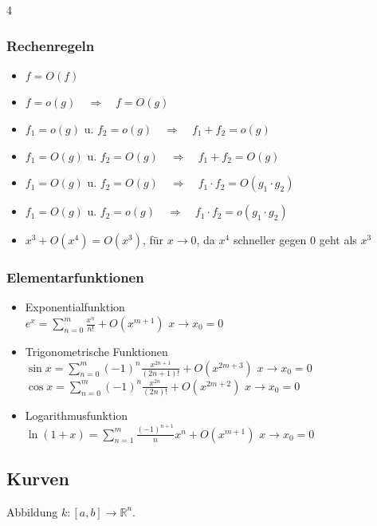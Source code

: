 \documentclass[6pt,a4paper]{scrartcl}
\begin{document}
\begin{multicols*}{4}
	\subsubsection{Rechenregeln}
	\begin{itemize}\itemsep-1pt
		\item $f = O(f)$
		\item $f = o(g) \quad\Rightarrow\quad f = O(g)$
		\item $f_1 = o(g)$ u. $f_2 = o(g) \quad\Rightarrow\quad f_1 + f_2 = o(g)$
		\item $f_1 = O(g)$ u. $f_2 = O(g) \quad\Rightarrow\quad f_1 + f_2 = O(g)$
		\item $f_1 = O(g)$ u. $f_2 = O(g) \quad\Rightarrow\quad f_1 \cdot f_2 = O(g_1 \cdot g_2)$
		\item $f_1 = O(g)$ u. $f_2 = o(g) \quad\Rightarrow\quad f_1 \cdot f_2 = o(g_1 \cdot g_2)$
		\item $x^3+O(x^4)=O(x^3)$, für $x \rightarrow 0$, da $x^4$ schneller gegen $0$ geht als $x^3$
	\end{itemize}
	\begin{sectionbox}
		\subsubsection{Elementarfunktionen}
		\begin{itemize}\itemsep-1pt
			\item Exponentialfunktion\\
			      $e^x = \sum\limits_{n = 0}^m\frac{x^n}{n!} + O(x^{m + 1})$ \qquad \qquad \qquad \qquad $x \rightarrow x_0=0$
			\item Trigonometrische Funktionen\\
			      $\sin{x} = \sum\limits_{n = 0}^m(-1)^n\frac{x^{2n + 1}}{(2n + 1)!} + O(x^{2m + 3})$ \qquad $x \rightarrow x_0=0$ \\
			      $\cos{x} = \sum\limits_{n = 0}^m(-1)^n\frac{x^{2n}}{(2n)!} + O(x^{2m + 2})$ \qquad $x \rightarrow x_0=0$
			\item Logarithmusfunktion\\
			      $\ln{(1+x)} = \sum\limits_{n = 1}^m\frac{(-1)^{n + 1}}{n}x^n + O(x^{m + 1})$ \quad $x \rightarrow x_0=0$
		\end{itemize}
	\end{sectionbox}

	\subsection{Kurven}
	Abbildung $k:[a,b] \rightarrow \mathbb R^n$.
	\begin{sectionbox}

\end{sectionbox}
\end{multicols*}
\end{document}
